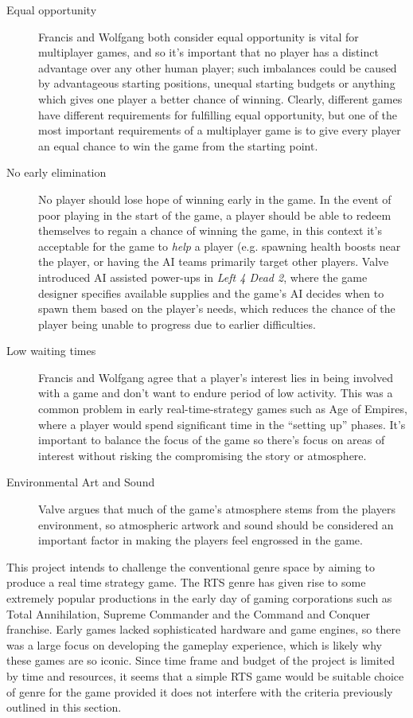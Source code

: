 \begin{description}
\item[Equal opportunity]
Francis and Wolfgang both consider equal opportunity is vital for multiplayer games, and so it's important that no player has a distinct advantage over any other human player; such imbalances could be caused by advantageous starting positions, unequal starting budgets or  anything which gives one player a better chance of winning. Clearly, different games have different requirements for fulfilling equal opportunity, but one of the most important requirements of a multiplayer game is to give every player an equal chance to win the game from the starting point. \cite{tomfrancis} \cite{wolfgangkramer}

\item[No early elimination]
No player should lose hope of winning early in the game. In the event of poor playing in the start of the game, a player should be able to redeem themselves to regain a chance of winning the game, in this context it's acceptable for the game to \emph{help} a player (e.g. spawning health boosts near the player, or having the AI teams primarily target other players. Valve introduced AI assisted power-ups in \emph{Left 4 Dead 2}, where the game designer specifies available supplies and the game's AI decides when to spawn them based on the player's needs, which reduces the chance of the player being unable to progress due to earlier difficulties. 

\item[Low waiting times]
Francis and Wolfgang agree that a player's interest lies in being involved with a game and don't want to endure period of low activity. This was a common problem in early real-time-strategy games such as Age of Empires, where a player would spend significant time in the ``setting up'' phases. It's important to balance the focus of the game so there's focus on areas of interest without risking the compromising the story or atmosphere. \cite{tomfrancis} \cite{wolfgangkramer}

\item[Environmental Art and Sound]
Valve argues that much of the game's atmosphere stems from the players environment, so atmospheric artwork and sound should be considered an important factor in making the players feel engrossed in the game.


\end{description}


This project intends to challenge the conventional genre space by aiming to produce a real time strategy game. The RTS genre has given rise to some extremely popular productions in the early day of gaming corporations such as Total Annihilation, Supreme Commander and the Command and Conquer franchise. Early games lacked sophisticated hardware and game engines, so there was a large focus on developing the gameplay experience, which is likely why these games are so iconic. Since time frame and budget of the project is limited by time and resources, it seems that a simple RTS game would be suitable choice of genre for the game provided it does not interfere with the criteria previously outlined in this section.
